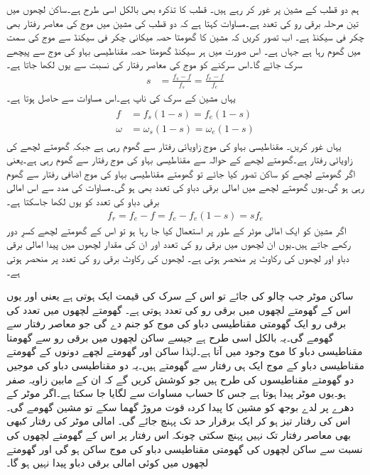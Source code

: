 ہم دو قطب کے مشین پر غور کر رہے ہیں۔ قطب کا تذکرہ بھی بالکل اسی طرح ہے۔ساکن لچھوں میں تین مرحلہ برقی رو کی تعدد  ہے۔مساوات   کہتا ہے کہ دو قطب کی مشین میں موج کی معاصر رفتار بھی  چکر فی سیکنڈ ہے۔ اب تصور کریں کہ مشین کا گھومتا حصہ  میکانی چکر فی سیکنڈ سے موج کی سمت میں گھوم رہا ہے جہاں  ہے۔ اس صورت میں ہر سیکنڈ گھومتا حصہ مقناطیسی بہاو کی موج سے پیچھے سرک جائے گا۔اس سرکنے کو موج کی معاصر رفتار کی نسبت سے یوں لکھا جاتا ہے۔
\begin{align}
s&=\frac{f_s-f}{f_s}=\frac{f_e-f}{f_e}
\end{align}
یہاں  مشین کے سرک کی ناپ ہے۔اس مساوات سے حاصل ہوتا ہے۔
\begin{gather}
\begin{aligned}\label{مساوات_امالی_سرک_اور_تعدد}
f&=f_s (1-s)=f_e(1-s)\\
\omega&=\omega_s(1-s)=\omega_e(1-s)
\end{aligned}
\end{gather}
یہاں غور کریں۔ مقناطیسی بہاو کی موج  زاویائی رفتار سے گھوم رہی ہے جبکہ  گھومتے لچھے کی زاویائی رفتار  ہے۔گھومتے لچھے کے حوالہ سے مقناطیسی بہاو کی موج  رفتار سے گھوم رہی ہے۔یعنی اگر گھومتے لچھے کو ساکن تصور کیا جائے تو گھومتے مقناطیسی بہاو کی موج  اضافی رفتار سے گھوم رہی ہو گی۔یوں گھومتے لچھے میں امالی برقی دباو کی تعدد بھی  ہو گی۔مساوات   کی مدد سے اس امالی برقی دباو کی تعدد  کو یوں لکھا جاسکتا ہے۔
\begin{align}\label{مساوات_امالی-سرک_تعلق_ب}
f_r=f_e-f=f_e-f_e(1-s)=s f_e
\end{align}
اگر مشین کو ایک امالی موٹر کے طور پر استعمال کیا جا رہا ہو تو اس کے گھومتے لچھے کسرِ دور رکھے جاتے ہیں۔یوں ان لچھوں میں برقی رو کی تعدد  اور ان کی مقدار لچھوں میں پیدا امالی برقی دباو اور لچھوں کی رکاوٹ پر منحصر ہوتی ہے۔ لچھوں کی رکاوٹ برقی رو کی تعدد پر منحصر ہوتی ہے۔

ساکن موٹر جب چالو کی جائے تو اس کے سرک  کی قیمت  ایک ہوتی ہے یعنی  اور یوں اس کے گھومتے لچھوں میں برقی رو کی تعدد  ہوتی ہے۔ گھومتے لچھوں میں   تعدد کی برقی رو ایک گھومتی مقناطیسی دباو کی موج کو جنم دے گی جو معاصر رفتار سے گھومے گی۔یہ بالکل اسی طرح ہے جیسے ساکن لچھوں میں برقی رو سے گھومتا مقناطیسی دباو کا موج وجود میں آتا ہے۔لہٰذا ساکن اور گھومتے لچھے دونوں کے گھومتے مقناطیسی دباو کے موج ایک ہی رفتار سے گھومتے ہیں۔یہ دو مقناطیسی دباو کی موجیں دو گھومتے مقناطیسوں کی طرح ہیں جو کوشش کریں گے کہ ان کے مابین زاویہ صفر ہو۔یوں موٹر  پیدا ہوتا ہے جس کا حساب  مساوات  سے لگایا جا سکتا ہے۔اگر موٹر کے دھرے پر لدے بوجھ کو مشین کا پیدا کردہ قوت مروڑ گھما سکے تو مشین گھومے گی۔اس کی رفتار تیز ہو کر ایک برقرار حد تک پہنچ جائے گی۔ امالی موٹر کی رفتار کبھی بھی معاصر رفتار تک نہیں پہنچ سکتی چونکہ اس رفتار پر اس کے گھومتے لچھوں کی نسبت سے ساکن لچھوں کی گھومتی مقناطیسی دباو کی موج ساکن ہو گی اور گھومتے لچھوں میں کوئی امالی برقی دباو پیدا نہیں ہو گا۔

